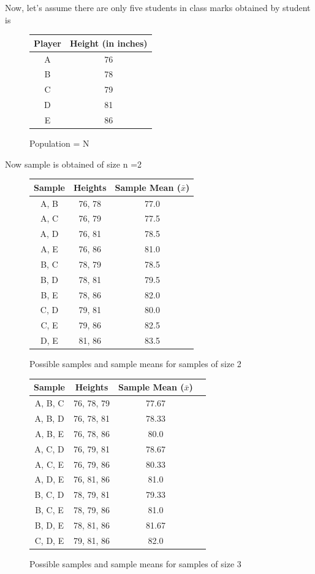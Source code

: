 \documentclass[12pt,a4paper]{article}
\theoremstyle{example}
\theoremstyle{definition}
\theoremstyle{theorem}
\begin{document}
Now, let's assume there are only five students in class marks obtained by student is 
\begin{figure}[H]
  \centering
\begin{tabular}{|c|c|}
  \hline
  Player & Height (in inches) \\
  \hline
  A & 76 \\
  B & 78 \\
  C & 79 \\
  D & 81 \\
  E & 86 \\
  \hline
 
\end{tabular}
\caption{Population = N}
 \end{figure}
Now sample is obtained of size n =2
\begin{figure}[H]
  \centering
\begin{tabular}{|c|c|c|}
  \hline
  Sample & Heights & Sample Mean (\(\bar{x}\)) \\
  \hline
  A, B & 76, 78 & 77.0 \\
  A, C & 76, 79 & 77.5 \\
  A, D & 76, 81 & 78.5 \\
  A, E & 76, 86 & 81.0 \\
  B, C & 78, 79 & 78.5 \\
  B, D & 78, 81 & 79.5 \\
  B, E & 78, 86 & 82.0 \\
  C, D & 79, 81 & 80.0 \\
  C, E & 79, 86 & 82.5 \\
  D, E & 81, 86 & 83.5 \\
  \hline
\end{tabular}
\caption{Possible samples and sample means for samples of size 2}
\end{figure}
\begin{figure}[H]
  \centering
\begin{tabular}{|c|c|c|c|}
  \hline
  Sample & Heights & Sample Mean (\(\bar{x}\)) \\
  \hline
  A, B, C & 76, 78, 79 & 77.67 \\
  A, B, D & 76, 78, 81 & 78.33 \\
  A, B, E & 76, 78, 86 & 80.0 \\
  A, C, D & 76, 79, 81 & 78.67 \\
  A, C, E & 76, 79, 86 & 80.33 \\
  A, D, E & 76, 81, 86 & 81.0 \\
  B, C, D & 78, 79, 81 & 79.33 \\
  B, C, E & 78, 79, 86 & 81.0 \\
  B, D, E & 78, 81, 86 & 81.67 \\
  C, D, E & 79, 81, 86 & 82.0 \\
  \hline
\end{tabular}
\caption{Possible samples and sample means for samples of size 3}
\end{figure}
\end{document}
